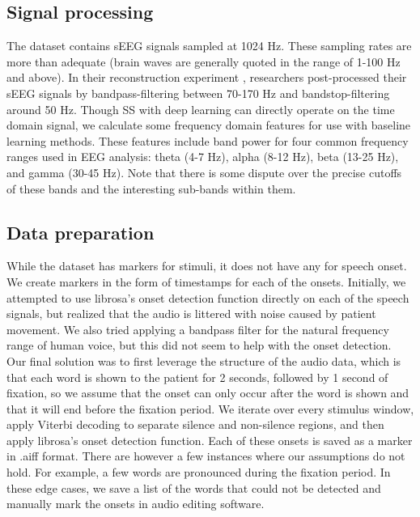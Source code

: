 \documentclass[format=sigconf, nonacm=true, review=true, screen=true]{acmart}
\begin{document}
\subsection{Signal processing}

The dataset contains sEEG signals sampled at 1024 Hz. These sampling rates are more than adequate (brain waves are generally quoted in the range of 1-100 Hz and above). In their reconstruction experiment \cite{verwoert2022dataset}, researchers post-processed their sEEG signals by bandpass-filtering between 70-170 Hz and bandstop-filtering around 50 Hz. Though SS with deep learning \cite{sakthi2021keyword} can directly operate on the time domain signal, we calculate some frequency domain features for use with baseline learning methods. These features include band power for four common frequency ranges used in EEG analysis: theta (4-7 Hz), alpha (8-12 Hz), beta (13-25 Hz), and gamma (30-45 Hz). Note that there is some dispute over the precise cutoffs of these bands and the interesting sub-bands within them.

\subsection{Data preparation}

While the dataset has markers for stimuli, it does not have any for speech onset. We create markers in the form of timestamps for each of the onsets. Initially, we attempted to use librosa's onset detection function directly on each of the speech signals, but realized that the audio is littered with noise caused by patient movement. We also tried applying a bandpass filter for the natural frequency range of human voice, but this did not seem to help with the onset detection. Our final solution was to first leverage the structure of the audio data, which is that each word is shown to the patient for 2 seconds, followed by 1 second of fixation, so we assume that the onset can only occur after the word is shown and that it will end before the fixation period. We iterate over every stimulus window, apply Viterbi decoding to separate silence and non-silence regions, and then apply librosa's onset detection function. Each of these onsets is saved as a marker in .aiff format. There are however a few instances where our assumptions do not hold. For example, a few words are pronounced during the fixation period. In these edge cases, we save a list of the words that could not be detected and manually mark the onsets in audio editing software.
\end{document}
